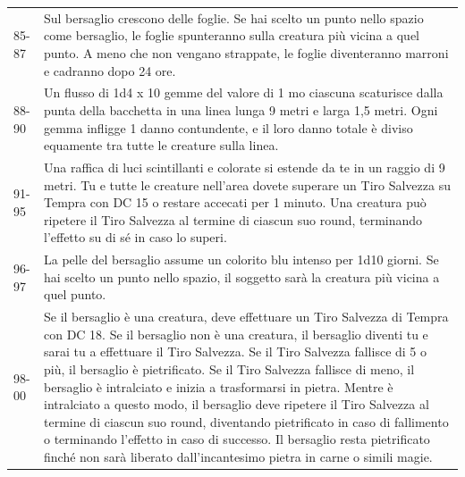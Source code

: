 \begin{tabularx}{0.95\textwidth}{lX}
85-87 &Sul bersaglio crescono delle foglie. Se hai scelto un punto nello spazio come bersaglio, le foglie spunteranno sulla creatura più vicina a quel punto. A meno che non vengano strappate, le foglie diventeranno marroni e cadranno dopo 24 ore.\\
88-90& Un flusso di 1d4 x 10 gemme del valore di 1 mo ciascuna scaturisce dalla punta della bacchetta in una linea lunga 9 metri e larga 1,5 metri. Ogni gemma infligge 1 danno contundente, e il loro danno totale è diviso equamente tra tutte le creature sulla linea.\\
91-95 &Una raffica di luci scintillanti e colorate si estende da te in un raggio di 9 metri. Tu e tutte le creature nell'area dovete superare un Tiro Salvezza su Tempra con DC 15 o restare accecati per 1 minuto. Una creatura può ripetere il Tiro Salvezza al termine di ciascun suo round, terminando l'effetto su di sé in caso lo superi.\\
96-97 &La pelle del bersaglio assume un colorito blu intenso per 1d10 giorni. Se hai scelto un punto nello spazio, il soggetto sarà la creatura più vicina a quel punto.\\
98-00 &Se il bersaglio è una creatura, deve effettuare un Tiro Salvezza di Tempra con DC 18. Se il bersaglio non è una creatura, il bersaglio diventi tu e sarai tu a effettuare il Tiro Salvezza. Se il Tiro Salvezza fallisce di 5 o più, il bersaglio è pietrificato. Se il Tiro Salvezza fallisce di meno, il bersaglio è intralciato e inizia a trasformarsi in pietra. Mentre è intralciato a questo modo, il bersaglio deve ripetere il Tiro Salvezza al termine di ciascun suo round, diventando pietrificato in caso di fallimento o terminando l'effetto in caso di successo. Il bersaglio resta pietrificato finché non sarà liberato dall'incantesimo pietra in carne o simili magie.\\
\end{tabularx}

\medskip


